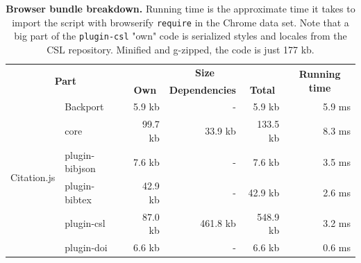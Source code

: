 \documentclass[fleqn,10pt,lineno]{wlpeerj} %
\begin{document}
\begin{table}[ht]
\caption{\textbf{Browser bundle breakdown.} Running time is the approximate time it takes to import the script with browserify \texttt{require} in the Chrome data set. Note that a big part of the \texttt{plugin-csl} "own" code is serialized styles and locales from the CSL repository. Minified and g-zipped, the code is just 177 kb.}
\label{table:size}
\begin{tabular}{|l|l|r|r|r|r|}
\hline
\multicolumn{2}{|c|}{\multirow{2}{*}{\textbf{Part}}} & \multicolumn{3}{c|}{\textbf{Size}}                                                                                   & \multicolumn{1}{c|}{\multirow{2}{*}{\textbf{Running time}}} \\ \cline{3-5}
\multicolumn{2}{|c|}{}                               & \multicolumn{1}{c|}{\textbf{Own}} & \multicolumn{1}{c|}{\textbf{Dependencies}} & \multicolumn{1}{c|}{\textbf{Total}} & \multicolumn{1}{c|}{}                                       \\ \hline
\multirow{10}{*}{Citation.js}    & Backport          & 5.9 kb                            & -                                          & 5.9 kb                              & 5.9 ms                                                      \\ \cline{2-6} 
                                 & core              & 99.7 kb                           & 33.9 kb                                    & 133.5 kb                            & 8.3 ms                                                      \\ \cline{2-6} 
                                 & plugin-bibjson    & 7.6 kb                            & -                                          & 7.6 kb                              & 3.5 ms                                                      \\ \cline{2-6} 
                                 & plugin-bibtex     & 42.9 kb                           & -                                          & 42.9 kb                             & 2.6 ms                                                      \\ \cline{2-6} 
                                 & plugin-csl        & 87.0 kb                           & 461.8 kb                                   & 548.9 kb                            & 3.2 ms                                                      \\ \cline{2-6} 
                                 & plugin-doi        & 6.6 kb                            & -                                          & 6.6 kb                              & 0.6 ms                                                      \\ \cline{2-6} 

\end{tabular}
\end{table}
\end{document}
